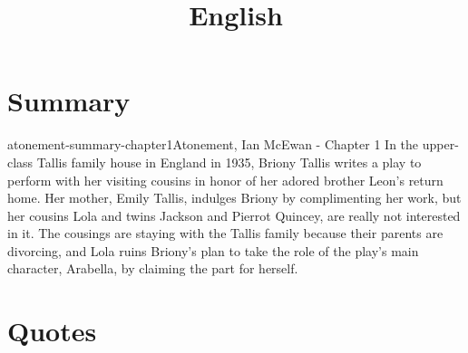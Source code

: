 \documentclass[preview]{standalone}
\begin{document}
\title{English}
\genpage

\section{Summary}

\begin{snippetsummary}{atonement-summary-chapter1}{Atonement, Ian McEwan - Chapter 1}
    In the upper-class Tallis family house in England in 1935,
    Briony Tallis writes a play to perform with her visiting
    cousins in honor of her adored brother Leon's return home.
    Her mother, Emily Tallis, indulges Briony by complimenting her work,
    but her cousins Lola and twins Jackson and Pierrot Quincey, are really
    not interested in it. The cousings are staying with the Tallis family
    because their parents are divorcing, and Lola ruins
    Briony's plan to take the role of the play's main character, Arabella, by
    claiming the part for herself.
\end{snippetsummary}

\section{Quotes}
\end{document}
